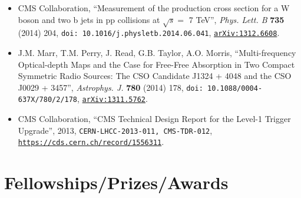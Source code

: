 \documentclass[10pt]{article} %
\begin{document}
\begin{itemize}
\item CMS Collaboration, 
  ``Measurement of the production cross section for a W boson
  and two b jets in pp collisions at $\sqrt{s}=$ 7 TeV'',
  \emph{Phys. Lett. B} {\bf 735} (2014) 204, 
  \texttt{doi: 10.1016/j.physletb.2014.06.041},
  \texttt{\href{http://arxiv.org/abs/1312.6608}{arXiv:1312.6608}}.

\item J.M. Marr, T.M. Perry, J. Read, G.B. Taylor, A.O. Morris, 
  ``Multi-frequency Optical-depth Maps and the Case for
  Free-Free Absorption in Two Compact Symmetric Radio
  Sources: The CSO Candidate J1324 + 4048 and the CSO J0029
  + 3457'',
  \emph{Astrophys. J.} {\bf 780} (2014) 178, 
  \texttt{doi: 10.1088/0004-637X/780/2/178},
  \texttt{\href{http://arxiv.org/abs/1311.5762}{arXiv:1311.5762}}.

\item CMS Collaboration, 
  ``CMS Technical Design Report for the Level-1 Trigger Upgrade'',
  2013, 
  \texttt{CERN-LHCC-2013-011, CMS-TDR-012},
  \texttt{\href{https://cds.cern.ch/record/1556311}{https://cds.cern.ch/record/1556311}}.

\end{itemize}



\section{Fellowships/Prizes/Awards}
\end{document}
